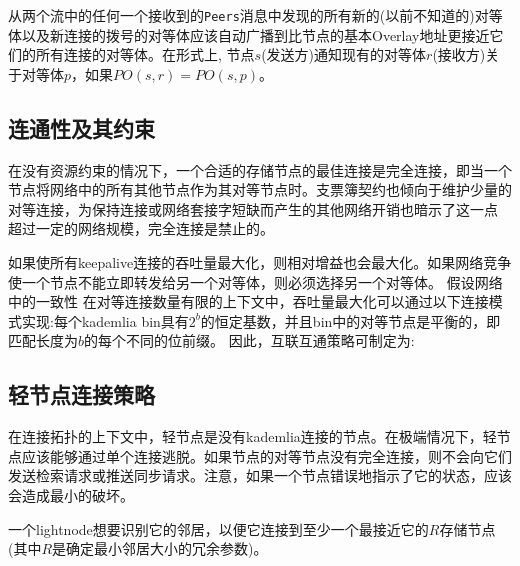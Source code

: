
从两个流中的任何一个接收到的\lstinline{Peers}消息中发现的所有新的(以前不知道的)对等体以及新连接的拨号的对等体应该自动广播到比节点的基本Overlay地址更接近它们的所有连接的对等体。在形式上, 
节点$s$(发送方)通知现有的对等体$r$(接收方)关于对等体$p$，如果$\mathit{PO}(s, r) = \mathit{PO}(s, p)$。 

\subsection{连通性及其约束}

在没有资源约束的情况下，一个合适的存储节点的最佳连接是完全连接，即当一个节点将网络中的所有其他节点作为其对等节点时。支票簿契约也倾向于维护少量的对等连接，为保持连接或网络套接字短缺而产生的其他网络开销也暗示了这一点 
超过一定的网络规模，完全连接是禁止的。

如果使所有keepalive连接的吞吐量最大化，则相对增益也会最大化。如果网络竞争使一个节点不能立即转发给另一个对等体，则必须选择另一个对等体。 
假设网络中的一致性 
在对等连接数量有限的上下文中，吞吐量最大化可以通过以下连接模式实现:每个kademlia bin具有$2^b$的恒定基数，并且bin中的对等节点是平衡的，即匹配长度为$b$的每个不同的位前缀。
因此，互联互通策略可制定为:







\subsection{轻节点连接策略}

在连接拓扑的上下文中，轻节点是没有kademlia连接的节点。在极端情况下，轻节点应该能够通过单个连接逃脱。如果节点的对等节点没有完全连接，则不会向它们发送检索请求或推送同步请求。注意，如果一个节点错误地指示了它的状态，应该会造成最小的破坏。 

一个lightnode想要识别它的邻居，以便它连接到至少一个最接近它的$R$存储节点(其中$R$是确定最小邻居大小的冗余参数)。



